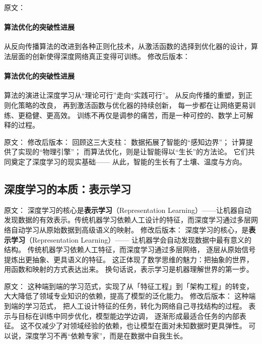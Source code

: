 原文：
\paragraph{算法优化的突破性进展}
从反向传播算法的改进到各种正则化技术，从激活函数的选择到优化器的设计，算法层面的创新使得深度网络真正变得可训练。
修改后版本：
\paragraph{算法优化的突破性进展}  
算法的演进让深度学习从“理论可行”走向“实践可行”。  
从反向传播的重塑，到正则化策略的改良，  
再到激活函数与优化器的持续创新，  
每一步都在让网络更易训练、更稳健、更高效。  
训练不再仅是调参的痛苦，而是一种可控的、数学上可解释的过程。  



原文：
修改后版本：
回顾这三大支柱：  
数据拓展了智能的“感知边界”；  
计算提供了实现的“物理引擎”；  
而算法优化，则是让智能得以“生长”的方法论。  
它们共同奠定了深度学习的现实基础——  
从此，智能的生长有了土壤、温度与方向。

\subsection{深度学习的本质：表示学习}

原文：
深度学习的核心是\textbf{表示学习}（Representation Learning）——让机器自动发现数据的有效表示。传统机器学习依赖人工设计的特征，而深度学习通过多层网络自动学习从原始数据到高级语义的映射。
修改后版本：
深度学习的核心，是\textbf{表示学习}（Representation Learning）——  
让机器学会自动发现数据中最有意义的结构。  
传统机器学习依赖人工特征，而深度学习通过多层网络，  
逐层从原始信号提炼出更抽象、更具语义的特征。  
这正体现了数学思维的魅力：把抽象的世界，用函数和映射的方式表达出来。  
换句话说，表示学习是机器理解世界的第一步。  



原文：
这种端到端的学习范式，实现了从「特征工程」到「架构工程」的转变，大大降低了领域专业知识的依赖，提高了模型的泛化能力。
修改后版本：
这种端到端的学习范式，  
把人工设计特征的任务，转化为网络自己寻找结构的过程。  
表示与目标在训练中同步优化，模型能边学边调，  
逐渐形成最适合任务的内部表征。  
这不仅减少了对领域经验的依赖，也让模型在面对未知数据时更具弹性。  
可以说，深度学习不再“依赖专家”，而是在数据中自我生长。  



